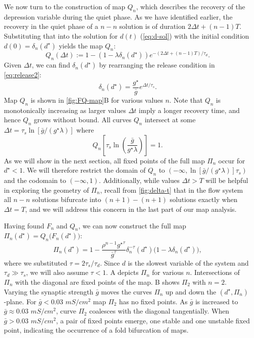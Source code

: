 \documentclass[utf8,draft]{frontiersFPHY} %
\newcommand{\dstar}{d^\star}
\newcommand{\gbar}{\bar g}
\newcommand{\delt}{\Delta t}
\newcommand{\dn}{\delta_n}
\begin{document}
We now turn to the construction of map $Q_{n}$, which describes the recovery of the depression variable during the quiet phase.
As we have identified earlier, the recovery in the quiet phase of a $n-n$ solution is of duration $2\delt +(n-1)T$.
Substituting that into the solution for $d(t)$ (\cref{eq:d-sol}) with the initial condition $d(0)=\dn(\dstar)$ yields the map $Q_{n}$:
\begin{equation}
 ~\label{eq:Qn-map}
  Q_{n}(\delt):=1- (1- \lambda \dn(\dstar))e^{-(2\Delta t+(n-1)T)/\tau_{d}}.
\end{equation}
Given $\delt$, we can find $\dn(\dstar)$ by rearranging the release condition in \cref{eq:release2}:
\begin{equation}
 ~\label{eq:dn}
  \dn(\dstar) = \frac{g^{\star}}{\gbar} e^{\delt/\tau_{s}}.
\end{equation}
Map $Q_{n}$ is shown in \cref{fig:FQ-map}B for various values $n$.
Note that $Q_{n}$ is monotonically increasing as larger values $\delt$ imply a longer recovery time, and hence $Q_{n}$ grows without bound.
All curves $Q_{n}$ intersect at some $\delt = \tau_{s}\ln{\left[\gbar/(g^{\star}\lambda)\right]}$ where
\begin{equation}
     ~\label{eq:Qn-intersect}
      Q_{n}\left[\tau_{s}\ln{\left(\frac{\gbar}{g^{\star}\lambda}\right)}\right]=1.
    \end{equation}
As we will show in the next section, all fixed points of the full map $\Pi_{n}$ occur for $d^{\star}<1$.
We will therefore restrict the domain of $Q_{n}$ to $(-\infty, \ln{\left[\gbar/(g^{\star}\lambda)\right]}\tau_{s})$ and the codomain to $(-\infty, 1)$.
Additionally, while values $\delt>T$ will be helpful in exploring the geometry of $\Pi_{n}$, recall from \cref{fig:delta-t} that in the flow system all $n-n$ solutions bifurcate into $(n+1)-(n+1)$ solutions exactly when $\Delta t=T$, and we will address this concern in the last part of our map analysis.

Having found $F_{n}$ and $Q_{n}$, we can now construct the full map $\Pi_{n}(d^{\star})=Q_{n}\big(F_{n}(d^{\star})\big)$:
\begin{equation}
 ~\label{eq:Pn-map}
  \Pi_{n}(d^{\star})= 1-
\frac{\rho^{n-1}{g^{\star}}^{\tau}}{{\gbar}^{\tau}}\delta_{n}^{-\tau}(d^{\star})\big(1-\lambda\delta_{n}(d^{\star})\big),
\end{equation}
where we substituted $\tau = 2\tau_{s}/\tau_{d}$.
Since $d$ is the slowest variable of the system and $\tau_{d}\gg \tau_{s}$, we will also assume $\tau<1$.
A depicts $\Pi_{n}$ for various $n$.
Intersections of $\Pi_{n}$ with the diagonal are fixed points of the map.
B shows $\Pi_{2}$ with $n=2$.
Varying the synaptic strength $\gbar$ moves the curves $\Pi_{n}$ up and down the $(d^{\star}, \Pi_{n})$-plane.
For $\gbar<0.03$ $\si{mS/cm^{2}}$ map $\Pi_{2}$ has no fixed points.
As $\gbar$ is increased to $\gbar \approx 0.03$ $\si{mS/cm^{2}}$, curve $\Pi_{2}$ coalesces with the diagonal tangentially.
When $\gbar > 0.03$ $\si{mS/cm^{2}}$, a pair of fixed points emerge, one stable and one unstable fixed point, indicating the occurrence of a fold bifurcation of maps.
\end{document}
